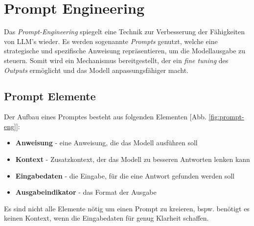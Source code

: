 \section{Prompt Engineering}
Das \textit{Prompt-Engineering} spiegelt eine Technik zur Verbesserung der Fähigkeiten von LLM's wieder. Es werden sogenannte \textit{Prompts} genutzt, welche eine strategische und spezifische Anweisung repräsentieren, um die Modellausgabe zu steuern. Somit wird ein Mechanismus bereitgestellt, der ein \textit{fine tuning} des \textit{Outputs} ermöglicht und das Modell anpassungsfähiger macht. \cite*{sahooSystematicSurveyPrompt2024} 

\subsection{Prompt Elemente}
Der Aufbau eines Promptes besteht aus folgenden Elementen [Abb. \ref{fig:prompt-eng}]:
\begin{itemize}
    \item \textbf{Anweisung} - eine Anweisung, die das Modell ausführen soll
    \item \textbf{Kontext} - Zusatzkontext, der das Modell zu besseren Antworten lenken kann
    \item \textbf{Eingabedaten} - die Eingabe, für die eine Antwort gefunden werden soll
    \item \textbf{Ausgabeindikator} - das Format der Ausgabe
\end{itemize}
Es sind nicht alle Elemente nötig um einen Prompt zu kreieren, bspw. benötigt es keinen Kontext, wenn die Eingabedaten für genug Klarheit schaffen. \cite*{ElementsPromptNextra2024}

